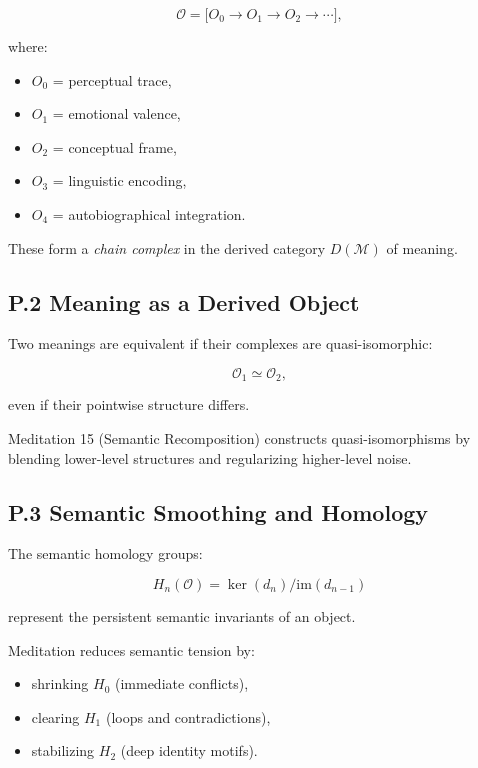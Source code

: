 \documentclass[12pt]{article}
\begin{document}
\[
\mathcal{O} =
\big[ 
O_0 \to O_1 \to O_2 \to \cdots 
\big],
\]

where:

\begin{itemize}
    \item $O_0$ = perceptual trace,
    \item $O_1$ = emotional valence,
    \item $O_2$ = conceptual frame,
    \item $O_3$ = linguistic encoding,
    \item $O_4$ = autobiographical integration.
\end{itemize}

These form a \emph{chain complex} in the derived category $D(\mathcal{M})$ of meaning.

\subsection*{P.2 Meaning as a Derived Object}

Two meanings are equivalent if their complexes are quasi-isomorphic:

\[
\mathcal{O}_1 \simeq \mathcal{O}_2,
\]

even if their pointwise structure differs.

Meditation 15 (Semantic Recomposition) constructs quasi-isomorphisms by blending
lower-level structures and regularizing higher-level noise.

\subsection*{P.3 Semantic Smoothing and Homology}

The semantic homology groups:

\[
H_n(\mathcal{O}) = \ker(d_n)/\mathrm{im}(d_{n-1})
\]

represent the persistent semantic invariants of an object.

Meditation reduces semantic tension by:

\begin{itemize}
\item shrinking $H_0$ (immediate conflicts),
\item clearing $H_1$ (loops and contradictions),
\item stabilizing $H_2$ (deep identity motifs).
\end{itemize}
\end{document}
